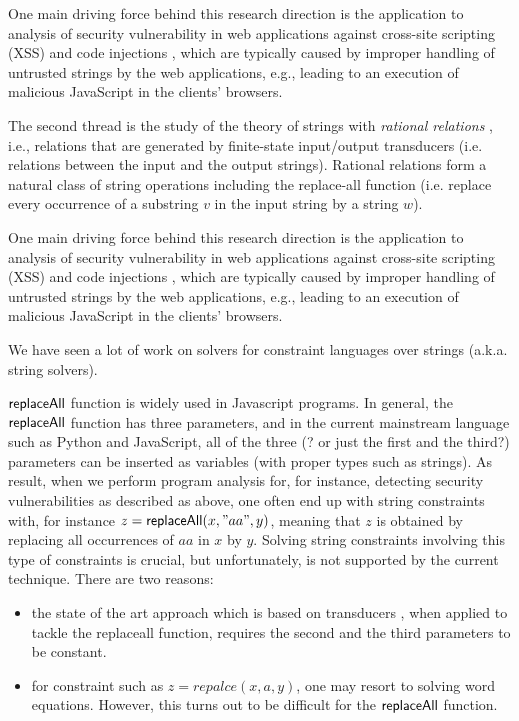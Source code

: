 
One main driving force behind this research direction is the application to analysis of security vulnerability
in web applications against cross-site scripting (XSS) and code injections 
\cite{??}, which 
are typically caused by improper handling of untrusted strings by the web 
applications, e.g., leading to an execution of malicious JavaScript in the 
clients' browsers. 

The second thread
is the study of the theory of strings with \emph{rational relations} \cite{??},
i.e., relations that are generated by finite-state input/output transducers
(i.e. relations between the input and the output strings). Rational relations
form a natural class of string operations including the replace-all function
(i.e. replace every occurrence of a substring $v$ in the input string by a
string $w$). 



One main driving force behind 
this research direction is the application to analysis of security vulnerability
in web applications against cross-site scripting (XSS) and code injections 
\cite{??}, which 
are typically caused by improper handling of untrusted strings by the web 
applications, e.g., leading to an execution of malicious JavaScript in the 
clients' browsers. 

We have seen  a lot of work on solvers for constraint languages over strings (a.k.a. string solvers). 


$\mathsf{replaceAll}$ function is widely used in Javascript programs. In general, the $\mathsf{replaceAll}$ function has three parameters, and in the current mainstream language such as Python and JavaScript, all of the three (? or just the first and the third?) parameters can be inserted as variables (with proper types such as strings). As result, when we perform program analysis for, for instance, detecting security vulnerabilities as described as above, one often end up with string constraints with, for instance $z=\mathsf{replaceAll}(x,"aa", y)$, meaning that $z$ is obtained by replacing all occurrences of $aa$ in $x$ by $y$. Solving string constraints involving this type of constraints is crucial, but unfortunately, is not supported by the current technique. There are two reasons:
\begin{itemize}
	\item the state of the art approach which is based on transducers \cite{LB16}, when applied to tackle the replaceall function, requires the second and the third parameters to be constant. 
	
	\item for constraint such as $z=repalce(x,a,y)$, one may resort to solving word equations. However, this turns out to be difficult for the $\mathsf{replaceAll}$ function.   
\end{itemize}


